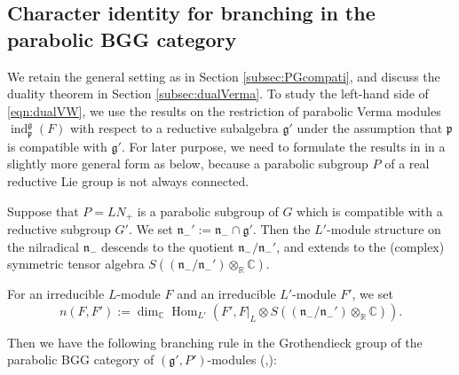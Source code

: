 \subsection{Character identity for branching in the parabolic BGG category}
\label{subsec:GroOp}

We retain the general setting 
 as in Section \ref{subsec:PGcompati}, 
 and discuss the duality theorem 
 in Section \ref{subsec:dualVerma}.  
To study the left-hand side of \eqref{eqn:dualVW}, 
 we use the results \cite{xktransgp12, KOSS} on the restriction
 of parabolic Verma modules
 ${\operatorname{ind}}_{\mathfrak{p}}^{\mathfrak{g}}(F)$
  with respect to a reductive subalgebra ${\mathfrak{g}}'$
 under the assumption
 that ${\mathfrak{p}}$ is compatible with ${\mathfrak{g}}'$.  
For later purpose, 
 we need to formulate the results
 in \cite{xktransgp12, KOSS}
 in a slightly more general form as below, 
 because a parabolic subgroup $P$ of a real reductive Lie group
 is not always connected.  




Suppose that $P =L N_+$ is a parabolic subgroup of $G$
 which is compatible with a reductive subgroup $G'$.  
We set ${\mathfrak{n}}_-':= {\mathfrak{n}}_- \cap {\mathfrak{g}}'$.  
Then the $L'$-module structure on the nilradical ${\mathfrak{n}}_-$
 descends to the quotient ${\mathfrak{n}}_-/{\mathfrak{n}}_-'$, 
 and extends to the (complex) symmetric tensor algebra
 $S(({\mathfrak{n}}_-/{\mathfrak{n}}_-') \otimes_{\mathbb{R}} {\mathbb{C}})$.  



For an irreducible $L$-module $F$
 and an irreducible $L'$-module $F'$, 
 we set 
\begin{equation}
\label{eqn:nFH}
  n(F,F') :=
  \dim_{\mathbb{C}}{\operatorname{Hom}}_{L'}
  (F',F|_L \otimes S(({\mathfrak{n}}_-/{\mathfrak{n}}_-') \otimes_{\mathbb{R}} {\mathbb{C}})).  
\end{equation}



Then we have the following branching rule
 in the Grothendieck group 
 of the parabolic BGG category
 of $({\mathfrak{g}}',P')$-modules
 ({{\cite[Prop.~5.2]{xktransgp12}},{\cite[Thm.~3.5]{KOSS}}}):

